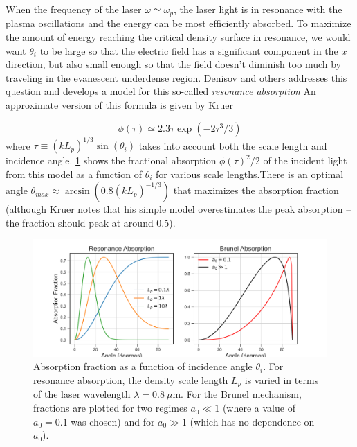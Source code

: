 When the frequency of the laser $\omega \simeq \omega_p$, the laser light is in resonance with the plasma oscillations and the energy can be most efficiently absorbed. To maximize the amount of energy reaching the critical density surface in resonance, we would want $\theta_i$ to be large so that the electric field has a significant component in the $x$ direction, but also small enough so that the field doesn't diminish too much by traveling in the evanescent underdense region. Denisov\cite{Denisov_1957_JETP} and others\cite{Forslund_1975_PRA, Freidberg_1972_PRL, Estabrook_1975_PoF} addresses this question and develops a model for this so-called \emph{resonance absorption} An approximate version of this formula is given by Kruer\cite{Kruer_2003_Plasma}

\begin{equation}
	\phi(\tau) \simeq 2.3 \tau \exp(-2 \tau^3 / 3)
\end{equation}
where $\tau \equiv (k L_p)^{1/3} \sin(\theta_i)$ takes into account both the scale length and incidence angle. \cref{fig:absorption} shows the fractional absorption $\phi(\tau)^2/2$ of the incident light from this model as a function of $\theta_i$ for various scale lengths.There is an optimal angle $\theta_{max} \approx \arcsin(0.8 (k L_p)^{-1/3})$ that maximizes the absorption fraction (although Kruer notes that his simple model overestimates the peak absorption -- the  fraction should peak at around 0.5\cite{Kruer_2003_Plasma}). 

\begin{figure}
	\centering 
	\includegraphics[width=\linewidth]{planning/images/absorption.png}
	\caption{Absorption fraction as a function of incidence angle $\theta_i$. For resonance absorption, the density scale length $L_p$ is varied in terms of the laser wavelength $\lambda = \SI{0.8}{\mu \meter}$. For the Brunel mechanism, fractions are plotted for two regimes $a_0 \ll 1$ (where a value of $a_0 = 0.1$ was chosen) and for $a_0 \gg 1$ (which has no dependence on $a_0$).}
	\label{fig:absorption}
\end{figure}

